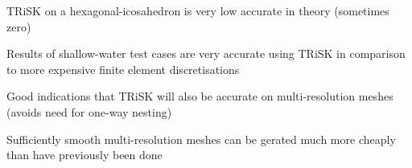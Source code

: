\begin{slide}

\begin{list0}

\item TRiSK on a hexagonal-icosahedron is very low accurate in theory (sometimes zero) \pauseHS

\item Results of shallow-water test cases are very accurate using TRiSK in comparison to more expensive finite element discretisations\pauseHS

\item Good indications that TRiSK will also be accurate on multi-resolution meshes (avoids need for one-way nesting) \pauseHS

\item Sufficiently smooth multi-resolution meshes can be gerated much more cheaply than have previously been done

\end{list0}

\end{slide}

